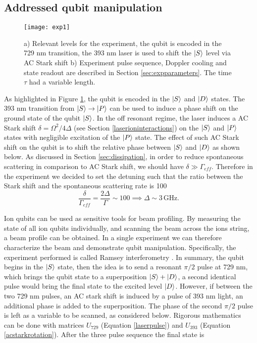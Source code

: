 \subsection{Addressed qubit manipulation}
\label{sec:expqubit}
\begin{figure}
\centering
\texttt{[image: exp1]}
\caption{a) Relevant levels for the experiment, the qubit is encoded in the 729 nm transition, the 393 nm laser is used to shift the $\ket{S}$ level via AC Stark shift b) Experiment pulse sequence, Doppler cooling and state readout are described in Section \ref{sec:expparameters}. The time $\tau$ had a variable length.}
\label{img:qualcosa}
\end{figure}
As highlighted in Figure \ref{img:qualcosa}, the qubit is encoded in the $\ket{S}$ and $\ket{D}$ states. The 393 nm transition from $\ket{S}\to \ket{P}$ can be used to induce a phase shift on the ground state of the qubit $\ket{S}$. In the off resonant regime, the laser induces a AC Stark shift $\delta = \Omega^2/4\Delta$ (see Section \ref{laserioninteractions}) on the $\ket{S}$ and $\ket{P}$ states with negligible excitation of the $\ket{P}$ state. The effect of such AC Stark shift on the qubit is to shift the relative phase between $\ket{S}$ and $\ket{D}$ as shown below. As discussed in Section \ref{sec:dissipation}, in order to reduce spontaneous scattering in comparison to AC Stark shift, we should have $\delta \gg \Gamma_{eff}$. Therefore in the experiment we decided to set the detuning such that the ratio between the Stark shift and the spontaneous scattering rate is 100
\begin{equation}
\frac{\delta}{\Gamma_{eff}} = \frac{2\Delta}{\Gamma} \sim 100 \implies \Delta \sim 3\,\text{GHz}.
\end{equation}
\par Ion qubits can be used as sensitive tools for beam profiling. By measuring the state of all ion qubits individually, and scanning the beam across the ions string, a beam profile can be obtained. In a single experiment we can therefore characterize the beam and demonstrate qubit manipulation.
Specifically, the experiment performed is called Ramsey interferometry \cite{Ramsey1950}. In summary, the qubit begins in the $\ket{S}$ state, then the idea is to send a resonant $\pi/2$ pulse at 729 nm, which brings the qubit state to a superposition $\ket{S}+\ket{D}$, a second identical pulse would bring the final state to the excited level $\ket{D}$. However, if between the two 729 nm pulses, an AC stark shift is induced by a pulse of 393 nm light, an additional phase is added to the superposition. The phase of the second $\pi/2$ pulse is left as a variable to be scanned, as considered below. Rigorous mathematics can be done with matrices $U_{729}$ (Equation \eqref{laserpulse}) and $U_{393}$ (Equation \eqref{acstarkrotation}). After the three pulse sequence the final state is
